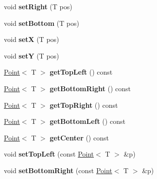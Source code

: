 \begin{DoxyCompactItemize}
\item 
\hypertarget{class_box_a037ab25102c5bf2d050282ed35d6a312}{
void {\bfseries setRight} (T pos)}
\label{class_box_a037ab25102c5bf2d050282ed35d6a312}

\item 
\hypertarget{class_box_ac5d43338470ef5bfab770786b170f454}{
void {\bfseries setBottom} (T pos)}
\label{class_box_ac5d43338470ef5bfab770786b170f454}

\item 
\hypertarget{class_box_a4dcb975c536439998d7f6c0fc47b2358}{
void {\bfseries setX} (T pos)}
\label{class_box_a4dcb975c536439998d7f6c0fc47b2358}

\item 
\hypertarget{class_box_a976594b18e7c135903607265a14ba783}{
void {\bfseries setY} (T pos)}
\label{class_box_a976594b18e7c135903607265a14ba783}

\item 
\hypertarget{class_box_ac0f698d9054c81ce3f0b9e45b208aa83}{
\hyperlink{class_point}{Point}$<$ T $>$ {\bfseries getTopLeft} () const }
\label{class_box_ac0f698d9054c81ce3f0b9e45b208aa83}

\item 
\hypertarget{class_box_a1cbff4ee05e798b43cda5ca603d004e7}{
\hyperlink{class_point}{Point}$<$ T $>$ {\bfseries getBottomRight} () const }
\label{class_box_a1cbff4ee05e798b43cda5ca603d004e7}

\item 
\hypertarget{class_box_a61afdde64f205f189aeff219bac2db24}{
\hyperlink{class_point}{Point}$<$ T $>$ {\bfseries getTopRight} () const }
\label{class_box_a61afdde64f205f189aeff219bac2db24}

\item 
\hypertarget{class_box_a0e7e1c5254740268ba77c9a0b27a4f06}{
\hyperlink{class_point}{Point}$<$ T $>$ {\bfseries getBottomLeft} () const }
\label{class_box_a0e7e1c5254740268ba77c9a0b27a4f06}

\item 
\hypertarget{class_box_a79994cde311637abfa037fed82144376}{
\hyperlink{class_point}{Point}$<$ T $>$ {\bfseries getCenter} () const }
\label{class_box_a79994cde311637abfa037fed82144376}

\item 
\hypertarget{class_box_ae155e4095a60d21cdd3677e018ef25c9}{
void {\bfseries setTopLeft} (const \hyperlink{class_point}{Point}$<$ T $>$ \&p)}
\label{class_box_ae155e4095a60d21cdd3677e018ef25c9}

\item 
\hypertarget{class_box_adbec284811aeec462e064a28f7aaaa8c}{
void {\bfseries setBottomRight} (const \hyperlink{class_point}{Point}$<$ T $>$ \&p)}
\label{class_box_adbec284811aeec462e064a28f7aaaa8c}


\end{DoxyCompactItemize}
